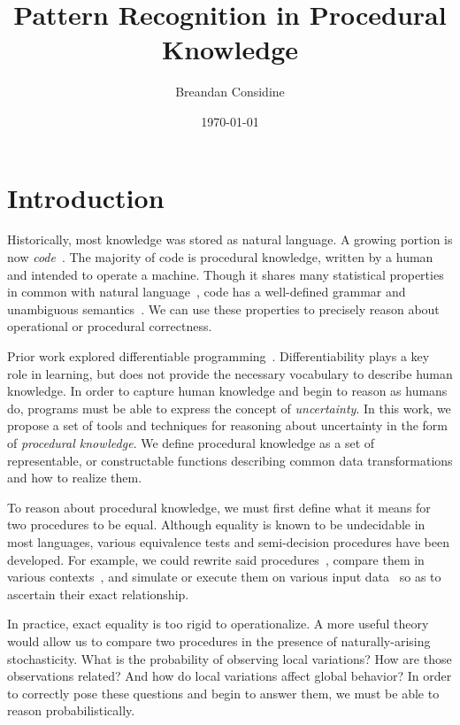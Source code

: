 \documentclass[11pt]{article}
\title{Pattern Recognition in Procedural Knowledge}
\author{Breandan Considine}
\date{\today}
\begin{document}
    \maketitle

    \tableofcontents
    \pagebreak


    \section{Introduction}

    Historically, most knowledge was stored as natural language. A growing portion is now \textit{code}~\citep{allamanis2018survey}. The majority of code is procedural knowledge, written by a human and intended to operate a machine. Though it shares many statistical properties in common with natural language~\citep{hindle2012naturalness}, code has a well-defined grammar and unambiguous semantics~\citep{pierce2010software}. We can use these properties to precisely reason about operational or procedural correctness.

    Prior work explored differentiable programming~\citep{considine2019programming}. Differentiability plays a key role in learning, but does not provide the necessary vocabulary to describe human knowledge. In order to capture human knowledge and begin to reason as humans do, programs must be able to express the concept of \textit{uncertainty}. In this work, we propose a set of tools and techniques for reasoning about uncertainty in the form of \textit{procedural knowledge}. We define procedural knowledge as a set of representable, or constructable functions describing common data transformations and how to realize them.

    To reason about procedural knowledge, we must first define what it means for two procedures to be equal. Although equality is known to be undecidable in most languages, various equivalence tests and semi-decision procedures have been developed. For example, we could rewrite said procedures~\citep{baader1999term}, compare them in various contexts~\citep{felleisen1990expressive}, and simulate or execute them on various input data~\citep{chen2020metamorphic} so as to ascertain their exact relationship.

    In practice, exact equality is too rigid to operationalize. A more useful theory would allow us to compare two procedures in the presence of naturally-arising stochasticity. What is the probability of observing local variations? How are those observations related? And how do local variations affect global behavior? In order to correctly pose these questions and begin to answer them, we must be able to reason probabilistically.
\end{document}
